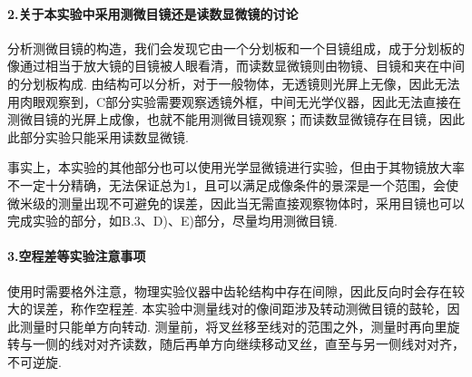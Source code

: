 \documentclass[UTF8]{ctexart}
\begin{document}
\paragraph{2.\quad 关于本实验中采用测微目镜还是读数显微镜的讨论}\quad\par
分析测微目镜的构造，我们会发现它由一个分划板和一个目镜组成，成于分划板的像通过相当于放大镜的目镜被人眼看清，而读数显微镜则由物镜、目镜和夹在中间的分划板构成. 由结构可以分析，对于一般物体，无透镜则光屏上无像，因此无法用肉眼观察到，C部分实验需要观察透镜外框，中间无光学仪器，因此无法直接在测微目镜的光屏上成像，也就不能用测微目镜观察；而读数显微镜存在目镜，因此此部分实验只能采用读数显微镜. \par
事实上，本实验的其他部分也可以使用光学显微镜进行实验，但由于其物镜放大率不一定十分精确，无法保证总为1，且可以满足成像条件的景深是一个范围，会使微米级的测量出现不可避免的误差，因此当无需直接观察物体时，采用目镜也可以完成实验的部分，如B.3、D)、E)部分，尽量均用测微目镜.\par

\paragraph{3.\quad 空程差等实验注意事项}\quad\par
使用时需要格外注意，物理实验仪器中齿轮结构中存在间隙，因此反向时会存在较大的误差，称作空程差. 本实验中测量线对的像间距涉及转动测微目镜的鼓轮，因此测量时只能单方向转动. 测量前，将叉丝移至线对的范围之外，测量时再向里旋转与一侧的线对对齐读数，随后再单方向继续移动叉丝，直至与另一侧线对对齐，不可逆旋.
\end{document}
